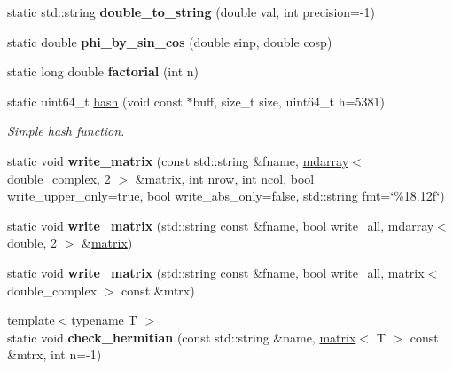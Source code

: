 \begin{DoxyCompactItemize}
\item 
\hypertarget{class_utils_ab4453211da2d1b6dfe29caea87b115cf}{}static std\+::string {\bfseries double\+\_\+to\+\_\+string} (double val, int precision=-\/1)\label{class_utils_ab4453211da2d1b6dfe29caea87b115cf}

\item 
\hypertarget{class_utils_a71f891b3befb16ab1439750184f7f9a4}{}static double {\bfseries phi\+\_\+by\+\_\+sin\+\_\+cos} (double sinp, double cosp)\label{class_utils_a71f891b3befb16ab1439750184f7f9a4}

\item 
\hypertarget{class_utils_aa8f301a730e8d4479f0055fc030d00c8}{}static long double {\bfseries factorial} (int n)\label{class_utils_aa8f301a730e8d4479f0055fc030d00c8}

\item 
static uint64\+\_\+t \hyperlink{class_utils_a76720df890bf8b5efe363e0f1fe9303d}{hash} (void const $\ast$buff, size\+\_\+t size, uint64\+\_\+t h=5381)
\begin{DoxyCompactList}\small\item\em Simple hash function. \end{DoxyCompactList}\item 
\hypertarget{class_utils_a9348a74851e5f7795bf823976523a319}{}static void {\bfseries write\+\_\+matrix} (const std\+::string \&fname, \hyperlink{classsddk_1_1mdarray}{mdarray}$<$ double\+\_\+complex, 2 $>$ \&\hyperlink{classsddk_1_1mdarray}{matrix}, int nrow, int ncol, bool write\+\_\+upper\+\_\+only=true, bool write\+\_\+abs\+\_\+only=false, std\+::string fmt=\char`\"{}\%18.\+12f\char`\"{})\label{class_utils_a9348a74851e5f7795bf823976523a319}

\item 
\hypertarget{class_utils_a3616e4ffb0b5a867cf6eb43555cf1176}{}static void {\bfseries write\+\_\+matrix} (std\+::string const \&fname, bool write\+\_\+all, \hyperlink{classsddk_1_1mdarray}{mdarray}$<$ double, 2 $>$ \&\hyperlink{classsddk_1_1mdarray}{matrix})\label{class_utils_a3616e4ffb0b5a867cf6eb43555cf1176}

\item 
\hypertarget{class_utils_a878bdc04bcb9270597799fc1b864e2c6}{}static void {\bfseries write\+\_\+matrix} (std\+::string const \&fname, bool write\+\_\+all, \hyperlink{classsddk_1_1mdarray}{matrix}$<$ double\+\_\+complex $>$ const \&mtrx)\label{class_utils_a878bdc04bcb9270597799fc1b864e2c6}

\item 
\hypertarget{class_utils_ab942f68d97deeeacca67d8fe37e0b334}{}{\footnotesize template$<$typename T $>$ }\\static void {\bfseries check\+\_\+hermitian} (const std\+::string \&name, \hyperlink{classsddk_1_1mdarray}{matrix}$<$ T $>$ const \&mtrx, int n=-\/1)\label{class_utils_ab942f68d97deeeacca67d8fe37e0b334}


\end{DoxyCompactItemize}
